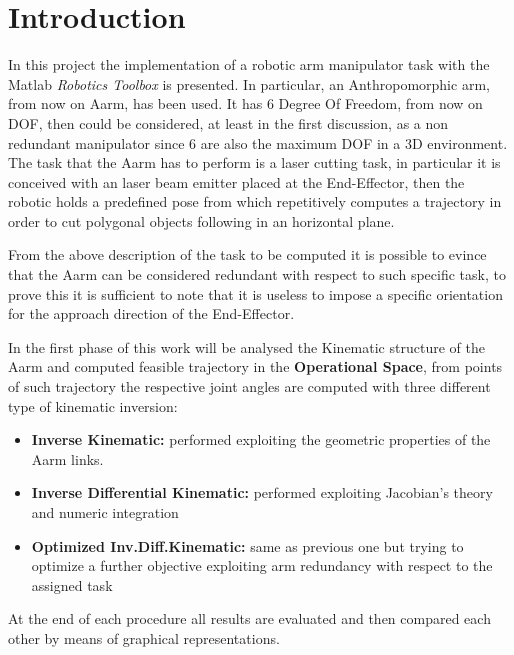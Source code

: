\section{Introduction}
\label{cha:intro}

In this project the implementation of a robotic arm manipulator task with the Matlab \textit{Robotics Toolbox} is presented. In particular, an Anthropomorphic arm, from now on Aarm, has been used. It has 6 Degree Of Freedom, from now on DOF, then could be considered, at least in the first discussion, as a non redundant manipulator since 6 are also the maximum DOF in a 3D environment. The task that the Aarm has to perform is a laser cutting task, in particular it is conceived with an laser beam emitter placed at the End-Effector, then the robotic holds a predefined pose from which repetitively computes a trajectory in order to cut polygonal objects following in an horizontal plane.

From the above description of the task to be computed it is possible to evince that the Aarm can be considered redundant with respect to such specific task, to prove this it is sufficient to note that it is useless to impose a specific orientation for the approach direction of the End-Effector. 

In the first phase of this work will be analysed the Kinematic structure of the Aarm and computed feasible trajectory in the \textbf{Operational Space}, from points of such trajectory the respective joint angles are computed with three different type of kinematic inversion:
\begin{itemize}
	\item \textbf{Inverse Kinematic:} performed exploiting the geometric properties of the Aarm links.
	\item \textbf{Inverse Differential Kinematic:} performed exploiting Jacobian's theory and numeric integration
	\item \textbf{Optimized Inv.Diff.Kinematic:} same as previous one but trying to optimize a further objective exploiting arm redundancy with respect to the assigned task
\end{itemize}
At the end of each procedure all results are evaluated and then compared each other by means of graphical representations.